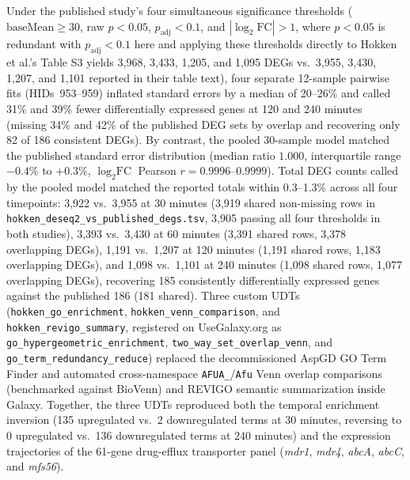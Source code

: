 \documentclass[11pt,letterpaper]{article}
\newcommand{\tool}[1]{\textsf{#1}}
\begin{document}
Under the published study's four simultaneous significance thresholds ($\text{baseMean} \ge 30$, raw $p < 0.05$, $p_{\text{adj}} < 0.1$, and $|\log_2\text{FC}| > 1$, where $p < 0.05$ is redundant with $p_{\text{adj}} < 0.1$ here and applying these thresholds directly to Hokken et al.'s Table S3 yields 3,968, 3,433, 1,205, and 1,095 DEGs vs.\ 3,955, 3,430, 1,207, and 1,101 reported in their table text), four separate 12-sample pairwise fits (HIDs~953--959) inflated standard errors by a median of 20--26\% and called 31\% and 39\% fewer differentially expressed genes at 120 and 240 minutes (missing 34\% and 42\% of the published DEG sets by overlap and recovering only 82 of 186 consistent DEGs). By contrast, the pooled 30-sample model matched the published standard error distribution (median ratio $1.000$, interquartile range $-0.4\%$ to $+0.3\%$, $\log_2\text{FC}$ Pearson $r = 0.9996\text{--}0.9999$). Total DEG counts called by the pooled model matched the reported totals within 0.3--1.3\% across all four timepoints: 3,922 vs.\ 3,955 at 30 minutes (3,919 shared non-missing rows in \nolinkurl{hokken_deseq2_vs_published_degs.tsv}, 3,905 passing all four thresholds in both studies), 3,393 vs.\ 3,430 at 60 minutes (3,391 shared rows, 3,378 overlapping DEGs), 1,191 vs.\ 1,207 at 120 minutes (1,191 shared rows, 1,183 overlapping DEGs), and 1,098 vs.\ 1,101 at 240 minutes (1,098 shared rows, 1,077 overlapping DEGs), recovering 185 consistently differentially expressed genes against the published 186 (181 shared). Three custom UDTs (\nolinkurl{hokken_go_enrichment}, \nolinkurl{hokken_venn_comparison}, and \nolinkurl{hokken_revigo_summary}, registered on UseGalaxy.org as \nolinkurl{go_hypergeometric_enrichment}, \nolinkurl{two_way_set_overlap_venn}, and \nolinkurl{go_term_redundancy_reduce}) replaced the decommissioned AspGD GO Term Finder and automated cross-namespace \texttt{AFUA\_}/\texttt{Afu} Venn overlap comparisons (benchmarked against \tool{BioVenn}) and \tool{REVIGO} semantic summarization inside Galaxy. Together, the three UDTs reproduced both the temporal enrichment inversion (135 upregulated vs.\ 2 downregulated terms at 30 minutes, reversing to 0 upregulated vs.\ 136 downregulated terms at 240 minutes) and the expression trajectories of the 61-gene drug-efflux transporter panel (\textit{mdr1}, \textit{mdr4}, \textit{abcA}, \textit{abcC}, and \textit{mfs56}).
\end{document}
